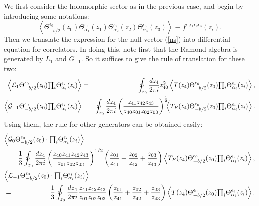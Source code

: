 \documentclass[a4paper,12pt]{article}
\newcommand{\vev}[1]{\left<{#1}\right>}
\newcommand{\tprod}{{\textstyle\prod}}
\newcommand{\ep}{{\epsilon}}
\begin{document}
   We first consider the holomorphic sector as in the previous case,
 and begin by introducing some notations:
\begin{equation}
  \vev{\Theta_{-b/2    }^{\ep_0}(z_0)
       \Theta_{\alpha_1}^{\ep_1}(z_1)
       \Theta_{\alpha_2}^{\ep_2}(z_2)
       \Theta_{\alpha_3}^{\ep_3}(z_3)}
 \equiv f^{\ep_0\ep_1\ep_2\ep_3}(z_i).
\label{SSSS}
\end{equation}
 Then we translate the expression for the null vector (\ref{ns})
 into differential equation for correlators.
 In doing this, note first that the Ramond algebra is generated by
 $L_1$ and $G_{-1}$.
 So it suffices to give the rule of translation for these two:
\begin{eqnarray}
  \vev{{\cal L}_1\Theta_{-b/2    }^{\ep_0}(z_0)\tprod_i
       \Theta_{\alpha_i}^{\ep_i}(z_i)}
 &=& \oint_{z_0}\frac{dz_4}{2\pi i}z_{40}^2
  \vev{T(z_4)
       \Theta_{-b/2    }^{\ep_0}(z_0)\tprod_i
       \Theta_{\alpha_i}^{\ep_i}(z_i)},
 \nonumber \\
  \vev{{\cal G}_{-1}\Theta_{-b/2    }^{\ep_0}(z_0)\tprod_i
       \Theta_{\alpha_i}^{\ep_i}(z_i)}
 &=& \oint_{z_0}\frac{dz_4}{2\pi i}
     \left(\frac{z_{41}z_{42}z_{43}}{z_{40}z_{01}z_{02}z_{03}}
     \right)^{\frac{1}{2}}\!\!\!
  \vev{T_F(z_4)
       \Theta_{-b/2    }^{\ep_0}(z_0)\tprod_i
       \Theta_{\alpha_i}^{\ep_i}(z_i)}.
\end{eqnarray}
 Using them, the rule for other generators can be obtained easily:
\begin{eqnarray}
\lefteqn{
  \vev{{\cal G}_0\Theta_{-b/2    }^{\ep_0}(z_0)\cdot\tprod_i
       \Theta_{\alpha_i}^{\ep_i}(z_i)} }\nonumber \\
 &=& \frac{1}{3}\oint_{z_0}\frac{dz_4}{2\pi i}
     \left(\frac{z_{40}z_{41}z_{42}z_{43}}{z_{01}z_{02}z_{03}}\right)^{1/2}
     \left(\frac{z_{01}}{z_{41}}
          +\frac{z_{02}}{z_{42}}
          +\frac{z_{03}}{z_{43}}\right)
  \vev{T_F(z_4)
       \Theta_{-b/2    }^{\ep_0}(z_0)\tprod_i
       \Theta_{\alpha_i}^{\ep_i}(z_i)},
 \nonumber \\
\lefteqn{
  \vev{{\cal L}_{-1}\Theta_{-b/2    }^{\ep_0}(z_0)\cdot\tprod_i
       \Theta_{\alpha_i}^{\ep_i}(z_i)} }\nonumber \\
 &=& \frac{1}{3}\oint_{z_0}\frac{dz_4}{2\pi i}
     \frac{z_{41}z_{42}z_{43}}{z_{01}z_{02}z_{03}}
     \left(\frac{z_{01}}{z_{41}}
          +\frac{z_{02}}{z_{42}}
          +\frac{z_{03}}{z_{43}}\right)
  \vev{T(z_4)
       \Theta_{-b/2    }^{\ep_0}(z_0)\tprod_i
       \Theta_{\alpha_i}^{\ep_i}(z_i)}.
\end{eqnarray}
\end{document}
